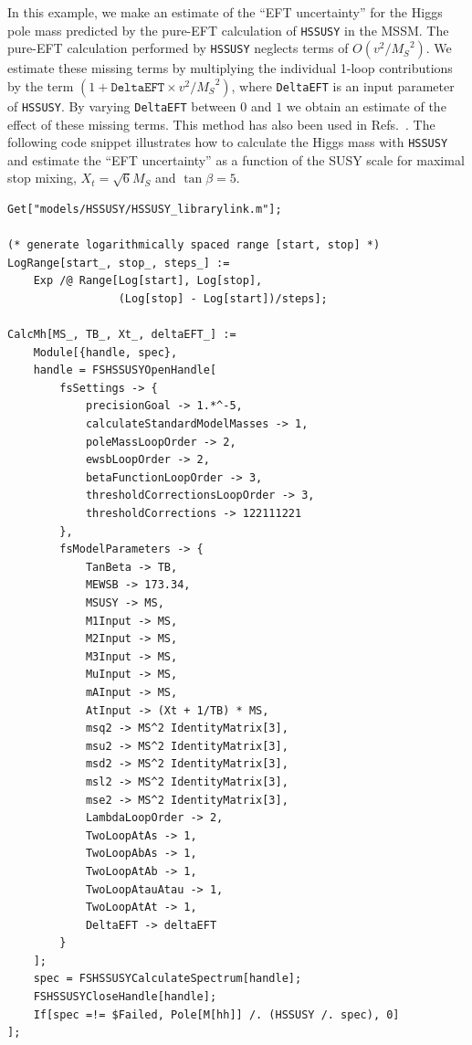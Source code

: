 \documentclass[final,3p,11pt,pdflatex]{elsarticle}
\makeatletter
\newcommand{\modelname}[1]{\texttt{#1}\@\xspace}
\newcommand{\HSSUSY}{\modelname{HSSUSY}}
\newcommand{\MS}{\ensuremath{M_S}\xspace}
\makeatother
\begin{document}
\begin{example}[label=ex:HSSUSY_EFT_uncertainty]
  In this example, we make an estimate of the ``EFT uncertainty''
  for the Higgs pole mass predicted by the pure-EFT calculation of
  \HSSUSY in the MSSM\@.  The pure-EFT calculation performed by \HSSUSY
  neglects terms of
  $O(v^2/\MS^2)$.  We estimate these missing terms by multiplying the
  individual 1-loop contributions by the term $(1 +
  \texttt{DeltaEFT}\times
  v^2/\MS^2)$, where \texttt{DeltaEFT} is an input parameter of
  \HSSUSY.  By varying \texttt{DeltaEFT} between $0$ and
  $1$ we obtain an estimate of the effect of these missing terms.
  This method has also been used in
  Refs.~\cite{Vega:2015fna,Athron:2016fuq,Bagnaschi:2017xid}.  The
  following code snippet illustrates how to calculate the Higgs mass
  with \HSSUSY and estimate the ``EFT uncertainty'' as a function of
  the SUSY scale for maximal stop mixing, $X_t =
  \sqrt{6}\MS$ and $\tan\beta = 5$.
  \begin{lstlisting}
Get["models/HSSUSY/HSSUSY_librarylink.m"];

(* generate logarithmically spaced range [start, stop] *)
LogRange[start_, stop_, steps_] :=
    Exp /@ Range[Log[start], Log[stop],
                 (Log[stop] - Log[start])/steps];

CalcMh[MS_, TB_, Xt_, deltaEFT_] :=
    Module[{handle, spec},
    handle = FSHSSUSYOpenHandle[
        fsSettings -> {
            precisionGoal -> 1.*^-5,
            calculateStandardModelMasses -> 1,
            poleMassLoopOrder -> 2,
            ewsbLoopOrder -> 2,
            betaFunctionLoopOrder -> 3,
            thresholdCorrectionsLoopOrder -> 3,
            thresholdCorrections -> 122111221
        },
        fsModelParameters -> {
            TanBeta -> TB,
            MEWSB -> 173.34,
            MSUSY -> MS,
            M1Input -> MS,
            M2Input -> MS,
            M3Input -> MS,
            MuInput -> MS,
            mAInput -> MS,
            AtInput -> (Xt + 1/TB) * MS,
            msq2 -> MS^2 IdentityMatrix[3],
            msu2 -> MS^2 IdentityMatrix[3],
            msd2 -> MS^2 IdentityMatrix[3],
            msl2 -> MS^2 IdentityMatrix[3],
            mse2 -> MS^2 IdentityMatrix[3],
            LambdaLoopOrder -> 2,
            TwoLoopAtAs -> 1,
            TwoLoopAbAs -> 1,
            TwoLoopAtAb -> 1,
            TwoLoopAtauAtau -> 1,
            TwoLoopAtAt -> 1,
            DeltaEFT -> deltaEFT
        }
    ];
    spec = FSHSSUSYCalculateSpectrum[handle];
    FSHSSUSYCloseHandle[handle];
    If[spec =!= $Failed, Pole[M[hh]] /. (HSSUSY /. spec), 0]
];


\end{lstlisting}
\end{example}
\end{document}
